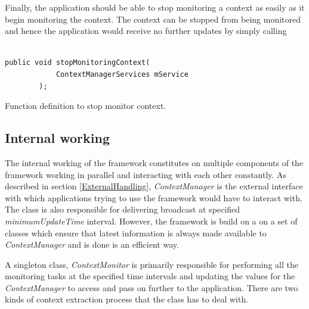 \documentclass[12pt]{report}
\begin{document}
Finally, the application should be able to stop monitoring a context as easily as it begin monitoring the context. The context can be stopped from being monitored and hence the application would receive no further updates by simply calling

\begin{program}
  \begin{verbatim}

public void stopMonitoringContext(
            ContextManagerServices mService
        );
\end{verbatim}
\label{monitorContextStopCall}
\caption{Function definition to stop monitor context.}
\end{program}

\subsection{Internal working}

The internal working of the framework constitutes on multiple components of the framework working in parallel and interacting with each other constantly. As described in section \ref{ExternalHandling}, \textit{ContextManager} is the external interface with which applications trying to use the framework would have to interact with. The class is also responsible for delivering broadcast at specified \textit{minimumUpdateTime} interval. However, the framework is build on a on a set of classes which ensure that latest information is always made available to \textit{ContextManager} and is done is an efficient way.

A singleton class, \textit{ContextMonitor} is primarily responsible for performing all the monitoring tasks at the specified time intervals and updating the values for the \textit{ContextManager} to access and pass on further to the application. There are two kinds of context extraction process that the class has to deal with.
\end{document}
